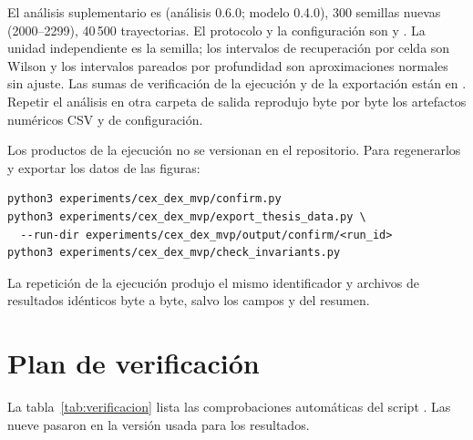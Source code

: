 El análisis suplementario es  (análisis 0.6.0; modelo 0.4.0), 300 semillas nuevas (2000--2299), 40\,500 trayectorias. El protocolo y la configuración son  y . La unidad independiente es la semilla; los intervalos de recuperación por celda son Wilson y los intervalos pareados por profundidad son aproximaciones normales sin ajuste. Las sumas de verificación de la ejecución y de la exportación están en . Repetir el análisis en otra carpeta de salida reprodujo byte por byte los artefactos numéricos CSV y de configuración.

Los productos de la ejecución no se versionan en el repositorio. Para regenerarlos y exportar los datos de las figuras:

\begin{verbatim}
python3 experiments/cex_dex_mvp/confirm.py
python3 experiments/cex_dex_mvp/export_thesis_data.py \
  --run-dir experiments/cex_dex_mvp/output/confirm/<run_id>
python3 experiments/cex_dex_mvp/check_invariants.py
\end{verbatim}

La repetición de la ejecución produjo el mismo identificador y archivos de resultados idénticos byte a byte, salvo los campos  y  del resumen.

\section{Plan de verificación}
\label{sec:verificacion}

La tabla~\ref{tab:verificacion} lista las comprobaciones automáticas del script . Las nueve pasaron en la versión usada para los resultados.

